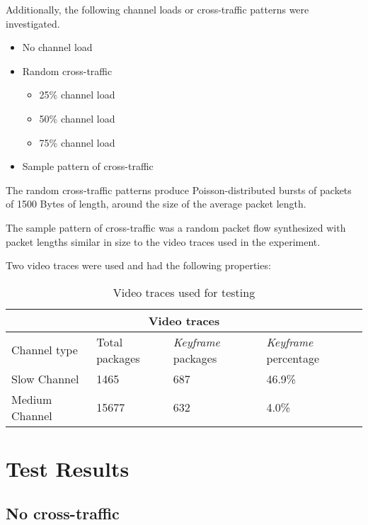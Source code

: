 Additionally, the following channel loads or cross-traffic patterns were investigated.

\begin{itemize}
	\item{No channel load}
	\item{Random cross-traffic}
		\begin{itemize}
			\item{25\% channel load}
			\item{50\% channel load}
			\item{75\% channel load}
		\end{itemize}
	\item{Sample pattern of cross-traffic}
\end{itemize}

The random cross-traffic patterns produce Poisson-distributed bursts of packets of 1500 Bytes of length, around the size of the average packet length. 

The sample pattern of cross-traffic was a random packet flow synthesized with packet lengths similar in size to the video traces used in the experiment.

Two video traces were used and had the following properties:

\begin{table}[htbp]
\caption{Video traces used for testing}
\break
\setlength{\arrayrulewidth}{1mm}
\setlength{\tabcolsep}{12pt}
\renewcommand{\arraystretch}{1.5}
 {
\begin{tabular}{ |p{3cm}|p{3cm}|p{3cm}|p{3cm}|  }
\hline
\multicolumn{4}{|c|}{Video traces} \\
\hline
Channel type & Total packages & \textit{Keyframe} packages & \textit{Keyframe} percentage\\
\hline
Slow Channel & 1465 & 687 & 46.9\%\\
Medium Channel & 15677 & 632 & 4.0\%\\

\hline
\end{tabular}
}
\end{table}




\section{Test Results}

\subsection{No cross-traffic}

